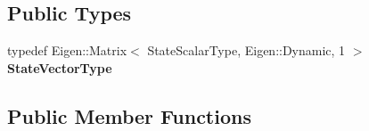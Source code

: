 \subsection*{Public Types}
\begin{DoxyCompactItemize}
\item 
typedef Eigen\+::\+Matrix$<$ State\+Scalar\+Type, Eigen\+::\+Dynamic, 1 $>$ {\bfseries State\+Vector\+Type}\hypertarget{classtudat_1_1propagators_1_1CustomStateDerivative_aeb6762568373f2ab6235d4c04e6881ff}{}\label{classtudat_1_1propagators_1_1CustomStateDerivative_aeb6762568373f2ab6235d4c04e6881ff}

\end{DoxyCompactItemize}
\subsection*{Public Member Functions}
